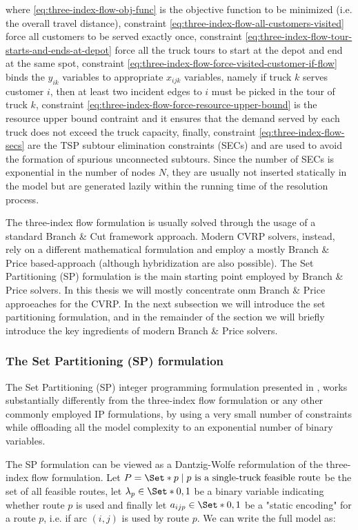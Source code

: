 where \eqref{eq:three-index-flow-obj-func} is the objective function to be minimized (i.e. the overall travel distance),
constraint \eqref{eq:three-index-flow-all-customers-visited} force all customers to be served exactly once,
constraint \eqref{eq:three-index-flow-tour-starts-and-ends-at-depot} force all the truck tours to start at the depot and end at the same spot,
constraint \eqref{eq:three-index-flow-force-visited-customer-if-flow} binds the $y_{ik}$ variables to appropriate $x_{ijk}$ variables,
namely if truck $k$ serves customer $i$, then at least two incident edges to $i$ must be picked in the tour of truck $k$,
constraint \eqref{eq:three-index-flow-force-resource-upper-bound} is the resource upper bound contraint and it ensures that the demand served by each truck does not exceed the truck capacity,
finally, constraint \eqref{eq:three-index-flow-secs} are the TSP subtour elimination constraints (SECs) and are used to avoid the formation of spurious unconnected subtours.
Since the number of SECs is exponential in the number of nodes $N$, they are usually not inserted statically in the model but are generated lazily within the running time of the resolution process.

The three-index flow formulation is usually solved through the usage of a standard Branch \& Cut framework approach.
Modern CVRP solvers, instead, rely on a different mathematical formulation and employ a  mostly Branch \& Price based-approach (although hybridization are also possible).
The Set Partitioning (SP) formulation is the main starting point employed by Branch \& Price solvers.
In this thesis we will mostly concentrate onm Branch \& Price approeaches for the CVRP.
In the next subsection we will introduce the set partitioning formulation, and in the remainder of the section
we will briefly introduce the key ingredients of modern Branch \& Price solvers.

\subsubsection{The Set Partitioning (SP) formulation}
The Set Partitioning (SP) integer programming formulation presented in \textcite{balinski1964integer},
works substantially differently from the three-index flow formulation or any other commonly employed
IP formulations, by using a very small number of constraints while offloading all the model complexity to an exponential number of binary variables.

The SP formulation can be viewed as a Dantzig-Wolfe reformulation \parencite{dantzig_decomposition_1960} of the three-index flow formulation.
Let $P = \Set*{p \mid p\ \text{is a single-truck feasible route}}$ be the set of all feasible routes,
let $\lambda_p \in \Set*{0, 1}$ be a binary variable indicating whether route $p$ is used
and finally let $a_{ijp} \in \Set*{0, 1}$ be a "static encoding" for a route $p$, i.e. if arc $(i, j)$ is used by route $p$.
We can write the full model as:


